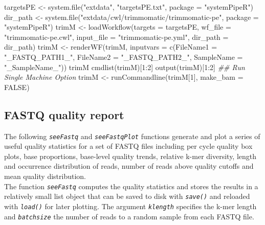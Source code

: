 \documentclass[14pt,]{article}
\newcommand{\hlnum}[1]{\textcolor[rgb]{0.816,0.125,0.439}{#1}}%
\newcommand{\hlstr}[1]{\textcolor[rgb]{0.251,0.627,0.251}{#1}}%
\newcommand{\hlcom}[1]{\textcolor[rgb]{0.502,0.502,0.502}{\textit{#1}}}%
\newcommand{\hlstd}[1]{\textcolor[rgb]{0.251,0.251,0.251}{#1}}%
\newenvironment{Shaded}{\begin{myshaded}}{\end{myshaded}}
\newcommand{\DecValTok}[1]{\hlnum{#1}}
\newcommand{\ConstantTok}[1]{\hlnum{#1}}
\newcommand{\SpecialCharTok}[1]{\hlstr{#1}}
\newcommand{\StringTok}[1]{\hlstr{#1}}
\newcommand{\DocumentationTok}[1]{\hlcom{#1}}
\newcommand{\OtherTok}[1]{{#1}}
\newcommand{\FunctionTok}[1]{\hlstd{#1}}
\newcommand{\AttributeTok}[1]{{#1}}
\newcommand{\NormalTok}[1]{\hlstd{#1}}
\begin{document}
\begin{Shaded}
\begin{Highlighting}[]
\NormalTok{targetsPE }\OtherTok{\textless{}{-}} \FunctionTok{system.file}\NormalTok{(}\StringTok{"extdata"}\NormalTok{, }\StringTok{"targetsPE.txt"}\NormalTok{, }\AttributeTok{package =} \StringTok{"systemPipeR"}\NormalTok{)}
\NormalTok{dir\_path }\OtherTok{\textless{}{-}} \FunctionTok{system.file}\NormalTok{(}\StringTok{"extdata/cwl/trimmomatic/trimmomatic{-}pe"}\NormalTok{, }\AttributeTok{package =} \StringTok{"systemPipeR"}\NormalTok{)}
\NormalTok{trimM }\OtherTok{\textless{}{-}} \FunctionTok{loadWorkflow}\NormalTok{(}\AttributeTok{targets =}\NormalTok{ targetsPE, }\AttributeTok{wf\_file =} \StringTok{"trimmomatic{-}pe.cwl"}\NormalTok{, }\AttributeTok{input\_file =} \StringTok{"trimmomatic{-}pe.yml"}\NormalTok{, }
    \AttributeTok{dir\_path =}\NormalTok{ dir\_path)}
\NormalTok{trimM }\OtherTok{\textless{}{-}} \FunctionTok{renderWF}\NormalTok{(trimM, }\AttributeTok{inputvars =} \FunctionTok{c}\NormalTok{(}\AttributeTok{FileName1 =} \StringTok{"\_FASTQ\_PATH1\_"}\NormalTok{, }\AttributeTok{FileName2 =} \StringTok{"\_FASTQ\_PATH2\_"}\NormalTok{, }
    \AttributeTok{SampleName =} \StringTok{"\_SampleName\_"}\NormalTok{))}
\NormalTok{trimM}
\FunctionTok{cmdlist}\NormalTok{(trimM)[}\DecValTok{1}\SpecialCharTok{:}\DecValTok{2}\NormalTok{]}
\FunctionTok{output}\NormalTok{(trimM)[}\DecValTok{1}\SpecialCharTok{:}\DecValTok{2}\NormalTok{]}
\DocumentationTok{\#\# Run Single Machine Option}
\NormalTok{trimM }\OtherTok{\textless{}{-}} \FunctionTok{runCommandline}\NormalTok{(trimM[}\DecValTok{1}\NormalTok{], }\AttributeTok{make\_bam =} \ConstantTok{FALSE}\NormalTok{)}
\end{Highlighting}
\end{Shaded}

\hypertarget{fastq-quality-report}{%
\subsection{FASTQ quality report}\label{fastq-quality-report}}

The following \emph{\texttt{seeFastq}} and \emph{\texttt{seeFastqPlot}} functions generate and plot a series of
useful quality statistics for a set of FASTQ files including per cycle quality
box plots, base proportions, base-level quality trends, relative k-mer
diversity, length and occurrence distribution of reads, number of reads above
quality cutoffs and mean quality distribution.\\
The function \emph{\texttt{seeFastq}} computes the quality statistics and stores the results in a
relatively small list object that can be saved to disk with \emph{\texttt{save()}} and
reloaded with \emph{\texttt{load()}} for later plotting. The argument \emph{\texttt{klength}} specifies the k-mer length and \emph{\texttt{batchsize}} the number of reads to a random sample from each
FASTQ file.
\end{document}
